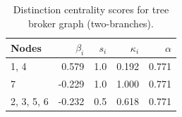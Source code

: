 \begin{table}
\centering
\caption{\label{tab:tree2}Distinction centrality scores for tree broker graph (two-branches).}
\centering
\begin{tabular}[t]{lrrrr}
\toprule
Nodes & $\beta_i$ & $s_i$ & $\kappa_i$ & $\alpha$\\
\midrule
1, 4 & 0.579 & 1.0 & 0.192 & 0.771\\
7 & -0.229 & 1.0 & 1.000 & 0.771\\
2, 3, 5, 6 & -0.232 & 0.5 & 0.618 & 0.771\\
\bottomrule
\end{tabular}
\end{table}
